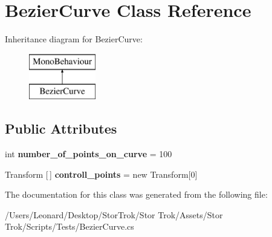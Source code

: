 \hypertarget{class_bezier_curve}{}\section{Bezier\+Curve Class Reference}
\label{class_bezier_curve}
Inheritance diagram for Bezier\+Curve\+:\begin{figure}[H]
\begin{center}
\leavevmode
\includegraphics[height=2.000000cm]{class_bezier_curve}
\end{center}
\end{figure}
\subsection*{Public Attributes}
\begin{DoxyCompactItemize}
\item 
\mbox{\label{class_bezier_curve_acbd74aa32496cfc588d30c3200662ba8}} 
int {\bfseries number\+\_\+of\+\_\+points\+\_\+on\+\_\+curve} = 100
\item 
\mbox{\label{class_bezier_curve_aca442eafb5988a261b23276c36fc279f}} 
Transform \mbox{[}$\,$\mbox{]} {\bfseries controll\+\_\+points} = new Transform\mbox{[}0\mbox{]}
\end{DoxyCompactItemize}


The documentation for this class was generated from the following file\+:\begin{DoxyCompactItemize}
\item 
/\+Users/\+Leonard/\+Desktop/\+Stor\+Trok/\+Stor Trok/\+Assets/\+Stor Trok/\+Scripts/\+Tests/Bezier\+Curve.\+cs\end{DoxyCompactItemize}
